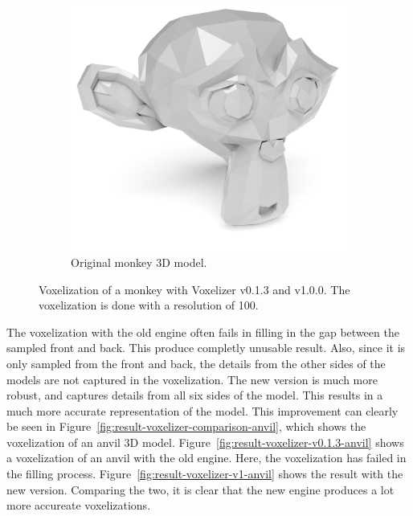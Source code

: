 \begin{figure}[hp]
\begin{subfigure}[b]{0.50\textwidth}
    \end{subfigure}
    \par\bigskip
    \begin{subfigure}[b]{0.43\textwidth}
        \centering
        \includegraphics[width=\textwidth]{sections/theory/figures/monkey.png}
        \caption{Original monkey 3D model.}
        \label{fig:result-original-monkey}
    \end{subfigure}
    \hfill
    \caption{Voxelization of a monkey with Voxelizer v0.1.3 and v1.0.0. The voxelization is done with a resolution of 100.}
    \label{fig:result-voxelizer-comparison-monkey}
\end{figure}
\clearpage
The voxelization with the old engine often fails in filling in the gap between the sampled front and back. This produce completly unusable result. Also, since it is only sampled from the front and back, the details from the other sides of the models are not captured in the voxelization. The new version is much more robust, and captures details from all six sides of the model. This results in a much more accurate representation of the model. This improvement can clearly be seen in Figure~\ref{fig:result-voxelizer-comparison-anvil}, which shows the voxelization of an anvil 3D model. Figure~\ref{fig:result-voxelizer-v0.1.3-anvil} shows a voxelization of an anvil with the old engine. Here, the voxelization has failed in the filling process. Figure~\ref{fig:result-voxelizer-v1-anvil} shows the result with the new version. Comparing the two, it is clear that the new engine produces a lot more accureate voxelizations.
